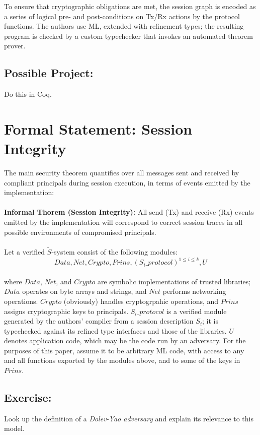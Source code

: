 \documentclass[a4paper,10pt]{article}
\begin{document}
To ensure that cryptographic obligations are met, the session graph is encoded as a series of logical
pre- and post-conditions on Tx/Rx actions by the protocol functions.  The authors use ML, extended
with refinement types; the resulting program is checked by a custom typechecker that invokes an
automated theorem prover.

\subsection{Possible Project:} Do this in Coq.\\


\section{Formal Statement: Session Integrity}

The main security theorem quantifies over all messages sent and received by compliant principals
during session execution, in terms of events emitted by the implementation:\\
\\
\textbf{Informal Thorem (Session Integrity):} All send (Tx) and receive (Rx) events emitted by
the implementation will correspond to correct session traces in all possible environments of
compromised principals.\\
\\
Let a verified $\tilde{S}$-system consist of the following modules:\\
\[
 Data, Net, Crypto, Prins, (S_i\_protocol)^{1 \le i \le k}, U
\]
\\
where $Data$, $Net$, and $Crypto$ are symbolic implementations of trusted libraries; $Data$ operates
on byte arrays and strings, and $Net$ performs networking operations.  $Crypto$ (obviously) handles
cryptogrpahic operations, and $Prins$ assigns cryptographic keys to principals.  $S_i\_protocol$ is
a verified module generated by the authors' compiler from a session description $S_i$; it is
typechecked against its refined type interfaces and those of the libraries.  $U$ denotes application
code, which may be the code run by an adversary.  For the purposes of this paper, assume it to be
arbitrary ML code, with access to any and all functions exported by the modules above, and to some
of the keys in $Prins$.\\

\subsection{Exercise:} Look up the definition of a \emph{Dolev-Yao adversary} and explain its
relevance to this model.\\
\\
\end{document}
